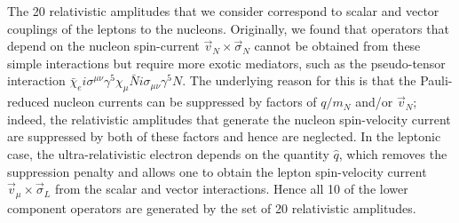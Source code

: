 \documentclass{book}[letterpaper,12pt]
\begin{document}
The 20 relativistic amplitudes that we consider correspond to scalar and vector couplings of the leptons to the nucleons.  Originally, we found that operators that depend on the nucleon spin-current $\vec{v}_N\times\vec{\sigma}_N$ cannot be obtained from these simple interactions but require more exotic mediators, such as the pseudo-tensor interaction $\bar{\chi}_ei\sigma^{\mu\nu}\gamma^5\chi_{\mu}\bar{N}i\sigma_{\mu\nu}\gamma^5 N$. The underlying reason for this is that the Pauli-reduced nucleon currents can be suppressed by factors of $q/m_N$ and/or $\vec{v}_N$; indeed, the relativistic amplitudes that generate the nucleon spin-velocity current are suppressed by both of these factors and hence are neglected. In the leptonic case, the ultra-relativistic electron depends on the quantity $\hat{q}$, which removes the suppression penalty and allows one to obtain the lepton spin-velocity current $\vec{v}_{\mu}\times\vec{\sigma}_L$ from the scalar and vector interactions. Hence all 10 of the lower component operators are generated by the set of 20 relativistic amplitudes.
\end{document}
